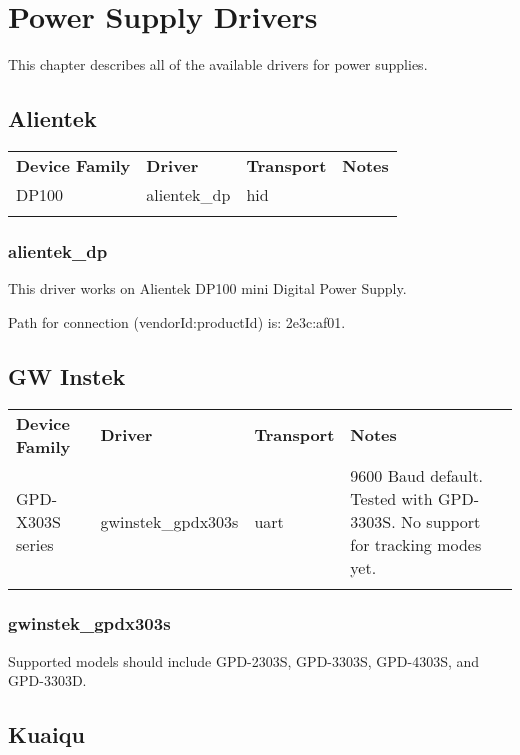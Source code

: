 \chapter{Power Supply Drivers}
\label{sec:powersupply-drivers}

This chapter describes all of the available drivers for power supplies.


\section{Alientek}

\begin{tabularx}{16cm}{lllX}
\thickhline
\textbf{Device Family} & \textbf{Driver} & \textbf{Transport} & \textbf{Notes} \\
\thickhline
DP100 & alientek\_dp & hid & \\
\thickhline
\end{tabularx}

\subsection{alientek\_dp}

This driver works on Alientek DP100 mini Digital Power Supply.

Path for connection (vendorId:productId) is: 2e3c:af01.

\section{GW Instek}

\begin{tabularx}{16cm}{lllX}
\thickhline
\textbf{Device Family} & \textbf{Driver} & \textbf{Transport} & \textbf{Notes} \\
\thickhline
GPD-X303S series & gwinstek\_gpdx303s & uart & 9600 Baud default. Tested with GPD-3303S. No support for tracking modes yet.\\
\thickhline
\end{tabularx}

\subsection{gwinstek\_gpdx303s}

Supported models should include GPD-2303S, GPD-3303S, GPD-4303S, and GPD-3303D.

\section{Kuaiqu}


